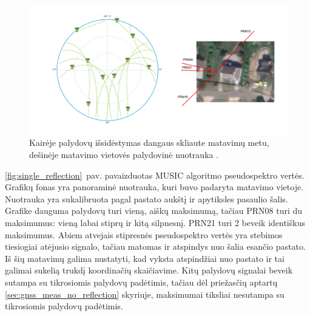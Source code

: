 \documentclass[main.tex]{subfiles}
\begin{document}
\begin{figure}[ht]
    \begin{centering}
    \includegraphics[scale=0.3]{drawings/one_reflection_sats.drawio}
    \par\end{centering}
    \protect\caption{\label{fig:single_reflection_sat_pos}Kairėje palydovų išsidėstymas dangaus skliaute matavimų metu, dešinėje matavimo vietovės palydovinė nuotrauka \cite{google_maps}.}
\end{figure}

\ref{fig:single_reflection}~pav. pavaizduotas MUSIC algoritmo pseudospektro vertės. Grafikų
fonas yra panoraminė nuotrauka, kuri buvo padaryta matavimo vietoje. Nuotrauka yra sukalibruota pagal
pastato aukštį ir apytiksles pasaulio šalis. Grafike dauguma palydovų turi vieną,
aiškų maksimumą, tačiau PRN08 turi du maksimumus: vieną labai stiprų ir kitą silpnesnį.
PRN21 turi 2 beveik identiškus maksimumus.
Abiem atvejais stipresnės pseudospektro vertės yra stebimos tiesiogiai atėjusio signalo, tačiau
matomas ir atspindys nuo šalia esančio pastato. Iš šių matavimų galima nustatyti, kad vyksta atspindžiai
nuo pastato ir tai galimai sukelią trukdį koordinačių skaičiavime.
Kitų palydovų signalai beveik sutampa su tikrosiomis palydovų padėtimis, tačiau dėl priežasčių aptartų
\ref{sec:gnss_meas_no_reflection} skyriuje, maksimumai tiksliai nesutampa su tikrosiomis palydovų padėtimis.
\end{document}
